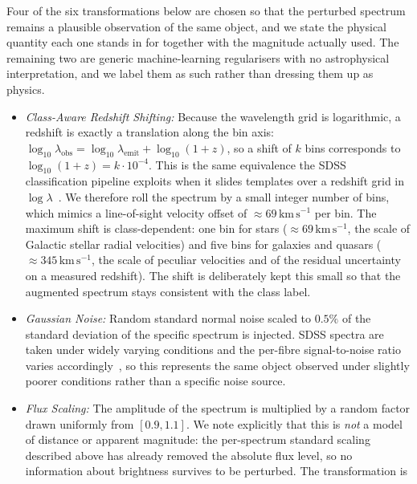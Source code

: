 Four of the six transformations below are chosen so that the perturbed spectrum remains a
plausible observation of the same object, and we state the physical quantity each one
stands in for together with the magnitude actually used. The remaining two are generic
machine-learning regularisers with no astrophysical interpretation, and we label them as
such rather than dressing them up as physics.
\begin{itemize}
    \item \textit{Class-Aware Redshift Shifting:} Because the wavelength grid is
          logarithmic, a redshift is exactly a translation along the bin axis:
          $\log_{10}\lambda_\text{obs} = \log_{10}\lambda_\text{emit} + \log_{10}(1+z)$,
          so a shift of $k$ bins corresponds to $\log_{10}(1+z) = k \cdot 10^{-4}$. This is
          the same equivalence the SDSS classification pipeline exploits when it slides
          templates over a redshift grid in $\log \lambda$~\cite{bolton2012boss}. We
          therefore roll the spectrum by a small integer number of bins, which mimics a
          line-of-sight velocity offset of $\approx 69\,\mathrm{km\,s^{-1}}$ per bin. The
          maximum shift is class-dependent: one bin for stars
          ($\approx 69\,\mathrm{km\,s^{-1}}$, the scale of Galactic stellar radial
          velocities) and five bins for galaxies and quasars
          ($\approx 345\,\mathrm{km\,s^{-1}}$, the scale of peculiar velocities and of the
          residual uncertainty on a measured redshift). The shift is deliberately kept
          this small so that the augmented spectrum stays consistent with the class label.
    \item \textit{Gaussian Noise:} Random standard normal noise scaled to $0.5\%$ of the
          standard deviation of the specific spectrum is injected. SDSS spectra are taken
          under widely varying conditions and the per-fibre signal-to-noise ratio varies
          accordingly~\cite{smee2013spectrographs}, so this represents the same object
          observed under slightly poorer conditions rather than a specific noise source.
    \item \textit{Flux Scaling:} The amplitude of the spectrum is multiplied by a random
          factor drawn uniformly from $[0.9, 1.1]$. We note explicitly that this is
          \emph{not} a model of distance or apparent magnitude: the per-spectrum standard
          scaling described above has already removed the absolute flux level, so no
          information about brightness survives to be perturbed. The transformation is

\end{itemize}

